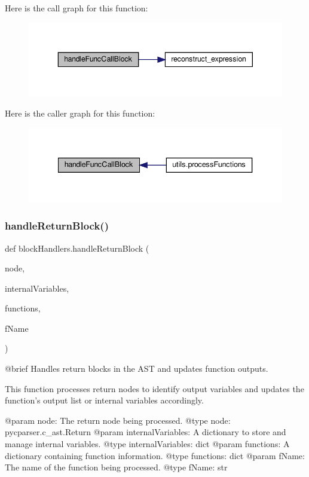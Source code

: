 Here is the call graph for this function\+:\nopagebreak
\begin{figure}[H]
\begin{center}
\leavevmode
\includegraphics[width=343pt]{namespaceblockHandlers_ac034bd474478ead202ae756242b4348c_cgraph}
\end{center}
\end{figure}
Here is the caller graph for this function\+:\nopagebreak
\begin{figure}[H]
\begin{center}
\leavevmode
\includegraphics[width=340pt]{namespaceblockHandlers_ac034bd474478ead202ae756242b4348c_icgraph}
\end{center}
\end{figure}
\mbox{\label{namespaceblockHandlers_a9a619208834c3d0aa0861354376f5208}} 
\subsubsection{\texorpdfstring{handle\+Return\+Block()}{handleReturnBlock()}}
{\footnotesize\ttfamily def block\+Handlers.\+handle\+Return\+Block (\begin{DoxyParamCaption}\item[{}]{node,  }\item[{}]{internal\+Variables,  }\item[{}]{functions,  }\item[{}]{f\+Name }\end{DoxyParamCaption})}

\begin{DoxyVerb}@brief Handles return blocks in the AST and updates function outputs.

This function processes return nodes to identify output variables and updates the function's output list or internal variables accordingly.

@param node: The return node being processed.
@type node: pycparser.c_ast.Return
@param internalVariables: A dictionary to store and manage internal variables.
@type internalVariables: dict
@param functions: A dictionary containing function information.
@type functions: dict
@param fName: The name of the function being processed.
@type fName: str
\end{DoxyVerb}
 

